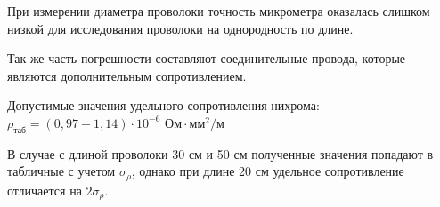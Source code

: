 \documentclass[a4paper, 12pt]{article}
\begin{document}
	При измерении диаметра проволоки точность микрометра оказалась слишком низкой для исследования проволоки на однородность по длине.
	
	Так же часть погрешности составляют соединительные провода, которые являются дополнительным сопротивлением.
	
	Допустимые значения удельного сопротивления нихрома: $\rho_\text{таб} = (0,97 - 1,14) \cdot 10^{-6} \text{ Ом}\cdot \text{мм}^2/\text{м}$ 	
	
	В случае с длиной проволоки 30 см и 50 см полученные значения попадают в табличные с учетом $\sigma_\rho$, однако при длине 20 см удельное сопротивление отличается на $2\sigma_\rho$.
	
	
	
	
	


	
	
	
	
	
\end{document}
